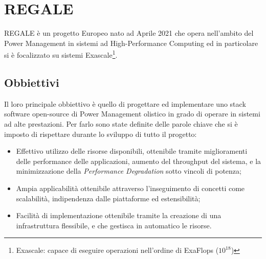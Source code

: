 \chapter{REGALE}
REGALE\cite{REGALE} è un progetto Europeo nato ad Aprile 2021 che opera nell'ambito del Power Management in sistemi ad High-Performance Computing ed in particolare si è focalizzato su sistemi Exascale\footnote{Exascale: capace di eseguire operazioni nell'ordine di ExaFlops ($10^{18}$)}.



\section{Obbiettivi}
Il loro principale obbiettivo è quello di progettare ed implementare uno stack software open-source di Power Management olistico in grado di operare in sistemi ad alte prestazioni. Per farlo sono state definite delle parole chiave che si è imposto di rispettare durante lo sviluppo di tutto il progetto:
\begin{itemize}
    \item Effettivo utilizzo delle risorse disponibili, ottenibile tramite miglioramenti delle performance delle applicazioni, aumento del throughput del sistema, e la minimizzazione della \emph{Performance Degradation} sotto vincoli di potenza;
    \item Ampia applicabilità ottenibile attraverso l'inseguimento di concetti come scalabilità, indipendenza dalle piattaforme ed estensibilità;
    \item Facilità di implementazione ottenibile tramite la creazione di una infrastruttura flessibile, e che gestisca in automatico le risorse.
\end{itemize}


